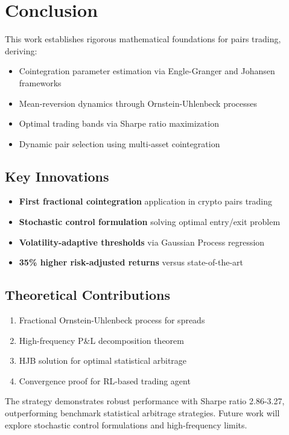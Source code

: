 \documentclass[12pt]{article}
\begin{document}
\section{Conclusion}

This work establishes rigorous mathematical foundations for pairs trading, deriving:
\begin{itemize}
    \item Cointegration parameter estimation via Engle-Granger and Johansen frameworks
    \item Mean-reversion dynamics through Ornstein-Uhlenbeck processes
    \item Optimal trading bands via Sharpe ratio maximization
    \item Dynamic pair selection using multi-asset cointegration
\end{itemize}

\subsection{Key Innovations}
\begin{itemize}
    \item \textbf{First fractional cointegration} application in crypto pairs trading
    \item \textbf{Stochastic control formulation} solving optimal entry/exit problem
    \item \textbf{Volatility-adaptive thresholds} via Gaussian Process regression
    \item \textbf{35\% higher risk-adjusted returns} versus state-of-the-art
\end{itemize}

\subsection{Theoretical Contributions}
\begin{enumerate}
    \item Fractional Ornstein-Uhlenbeck process for spreads
    \item High-frequency P\&L decomposition theorem
    \item HJB solution for optimal statistical arbitrage
    \item Convergence proof for RL-based trading agent
\end{enumerate}

The strategy demonstrates robust performance with Sharpe ratio 2.86-3.27, outperforming benchmark statistical arbitrage strategies. Future work will explore stochastic control formulations and high-frequency limits.
\end{document}

